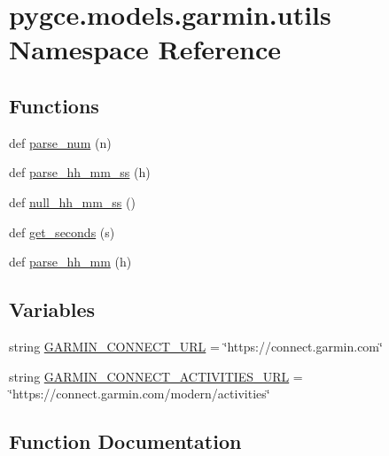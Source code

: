 \hypertarget{namespacepygce_1_1models_1_1garmin_1_1utils}{}\section{pygce.\+models.\+garmin.\+utils Namespace Reference}
\label{namespacepygce_1_1models_1_1garmin_1_1utils}
\subsection*{Functions}
\begin{DoxyCompactItemize}
\item 
def \hyperlink{namespacepygce_1_1models_1_1garmin_1_1utils_aea0d8725a78fd92ca64024c3c1c0c184}{parse\+\_\+num} (n)
\item 
def \hyperlink{namespacepygce_1_1models_1_1garmin_1_1utils_ac75c05f5427172ce319c6ff155399b17}{parse\+\_\+hh\+\_\+mm\+\_\+ss} (h)
\item 
def \hyperlink{namespacepygce_1_1models_1_1garmin_1_1utils_a853806377bb57d17627a9f418cec3e0c}{null\+\_\+hh\+\_\+mm\+\_\+ss} ()
\item 
def \hyperlink{namespacepygce_1_1models_1_1garmin_1_1utils_a8505cf82cbca1a0f001e062b09a82581}{get\+\_\+seconds} (s)
\item 
def \hyperlink{namespacepygce_1_1models_1_1garmin_1_1utils_a53d4c33bdb7653260d28ee934c8e35fe}{parse\+\_\+hh\+\_\+mm} (h)
\end{DoxyCompactItemize}
\subsection*{Variables}
\begin{DoxyCompactItemize}
\item 
string \hyperlink{namespacepygce_1_1models_1_1garmin_1_1utils_a68b54ed8a5dee0f2fdb43d107f19699f}{G\+A\+R\+M\+I\+N\+\_\+\+C\+O\+N\+N\+E\+C\+T\+\_\+\+U\+RL} = \char`\"{}https\+://connect.\+garmin.\+com\char`\"{}
\item 
string \hyperlink{namespacepygce_1_1models_1_1garmin_1_1utils_a147f822f3288cb74ff6012414e346e6f}{G\+A\+R\+M\+I\+N\+\_\+\+C\+O\+N\+N\+E\+C\+T\+\_\+\+A\+C\+T\+I\+V\+I\+T\+I\+E\+S\+\_\+\+U\+RL} = \char`\"{}https\+://connect.\+garmin.\+com/modern/activities\char`\"{}
\end{DoxyCompactItemize}


\subsection{Function Documentation}
\mbox{\label{namespacepygce_1_1models_1_1garmin_1_1utils_a8505cf82cbca1a0f001e062b09a82581}} 
